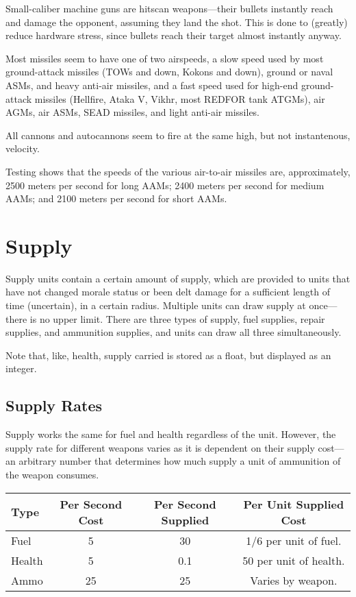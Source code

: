 \documentclass{article}
\begin{document}
Small-caliber machine guns are hitscan weapons---their bullets instantly reach
and damage the opponent, assuming they land the shot. This is done to
(greatly) reduce hardware stress, since bullets reach their target almost
instantly anyway.

Most missiles seem to have one of two airspeeds, a slow speed used by most
ground-attack missiles (TOWs and down, Kokons and down), ground or naval
ASMs, and heavy anti-air missiles, and a fast speed used for high-end
ground-attack missiles (Hellfire, Ataka V, Vikhr, most REDFOR tank ATGMs), air
AGMs, air ASMs, SEAD missiles, and light anti-air missiles.

All cannons and autocannons seem to fire at the same high, but not instantenous,
velocity.

Testing shows that the speeds of the various air-to-air missiles are,
approximately, 2500 meters per second for long AAMs; 2400 meters per second for
medium AAMs; and 2100 meters per second for short AAMs.

\section{Supply}

Supply units contain a certain amount of supply, which are provided to units
that have not changed morale status or been delt damage for a sufficient
length of time (uncertain), in a certain radius. Multiple units can draw supply
at once---there is no upper limit. There are three types of supply, fuel supplies, repair
supplies, and ammunition supplies, and units can draw all three simultaneously.

Note that, like, health, supply carried is stored as a float, but displayed as
an integer.

\subsection{Supply Rates}

Supply works the same for fuel and health regardless of the unit. However, the
supply rate for different weapons varies as it is dependent on their supply
cost---an arbitrary number that determines how much supply a unit of ammunition
of the weapon consumes.

\begin{center}
    \begin{tabular}{ | l | c | c | c | }
    \hline
    Type & Per Second Cost & Per Second Supplied & Per Unit Supplied Cost \\
    \hline
    	Fuel & 5 & 30 & 1/6 per unit of fuel.\\
    	Health & 5 & 0.1 & 50 per unit of health.\\
    	Ammo & 25 & 25 & Varies by weapon.\\
    \hline
    \end{tabular}
\end{center}
\end{document}
